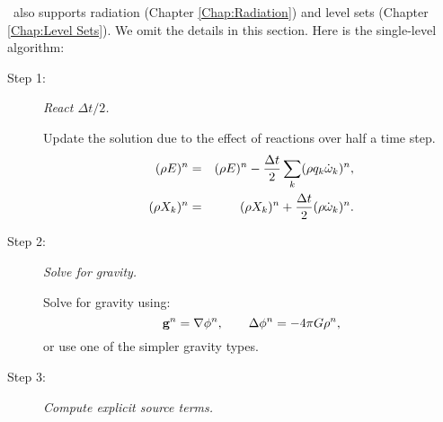 \castro\ also supports radiation (Chapter \ref{Chap:Radiation}) and
level sets (Chapter \ref{Chap:Level Sets}).  We omit the details in
this section.  Here is the single-level algorithm:
\begin{description}
\item[Step 1:] {\em React $\Delta t/2$.}

Update the solution due to the effect of reactions over half a time step.
\begin{eqnarray}
(\rho E)^n &=& (\rho E)^n - \frac{\Delta t}{2}\sum_k(\rho q_k\dot\omega_k)^n,\\
(\rho X_k)^n &=& (\rho X_k)^n + \frac{\Delta t}{2}(\rho\dot\omega_k)^n.
\end{eqnarray}
\item[Step 2:] {\em Solve for gravity.}

Solve for gravity using:
\begin{equation}
{\bf g}^n = \nabla\phi^n, \qquad 
\Delta\phi^n = -4\pi G\rho^n,
\end{equation}
or use one of the simpler gravity types.

\item[Step 3:] {\em Compute explicit source terms.}


\end{description}
